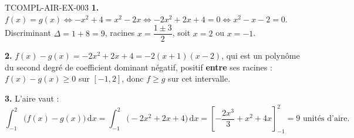 \begin{corrige}{TCOMPL-AIR-EX-003}
\textbf{1.} $f(x)=g(x) \iff -x^2+4 = x^2-2x \iff -2x^2+2x+4=0 \iff x^2-x-2=0$. Discriminant $\Delta=1+8=9$, racines $x=\dfrac{1\pm3}{2}$, soit $x=2$ ou $x=-1$.

\textbf{2.} $f(x)-g(x) = -2x^2+2x+4 = -2(x+1)(x-2)$, qui est un polynôme du second degré de coefficient dominant négatif, positif \textbf{entre} ses racines : $f(x)-g(x)\geq0$ sur $[-1,2]$, donc $f\geq g$ sur cet intervalle.

\textbf{3.} L'aire vaut :
\[
  \int_{-1}^{2} \big(f(x)-g(x)\big)\,\mathrm{d}x = \int_{-1}^{2}\big(-2x^2+2x+4\big)\,\mathrm{d}x = \left[-\frac{2x^3}{3}+x^2+4x\right]_{-1}^{2} = 9 \text{ unités d'aire.}
\]
\end{corrige}
